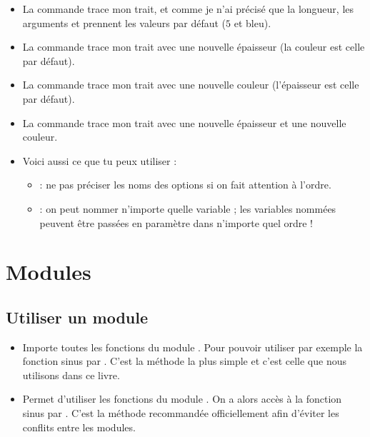 \documentclass[11pt,class=report,crop=false]{standalone}
\begin{document}
\begin{itemize}
  \item La commande  trace mon trait, et comme je n'ai précisé que la longueur, les arguments  et  prennent les valeurs par défaut ($5$ et bleu).
  
   \item La commande  trace mon trait avec une nouvelle épaisseur (la couleur est celle par défaut).
   
    \item La commande  trace mon trait avec une nouvelle couleur (l'épaisseur est celle par défaut).  
    
     \item La commande  trace mon trait avec une nouvelle épaisseur et une nouvelle couleur.
     
     \item Voici aussi ce que tu peux utiliser :
     \begin{itemize}
       \item {} : ne pas préciser les noms des options si on fait attention à l'ordre.
       \item {} : on peut nommer n'importe quelle variable ; les variables nommées peuvent être passées en paramètre dans n'importe quel ordre !
 
  \end{itemize}   
\end{itemize}   


\section{Modules}

\subsection{Utiliser un module}

\begin{itemize}
  \item {} \quad Importe toutes les fonctions du module . Pour pouvoir utiliser par exemple la fonction sinus par . C'est la méthode la plus simple et c'est celle que nous utilisons dans ce livre.
  
  \item {} \quad Permet d'utiliser les fonctions du module . On a alors accès à la fonction sinus par . C'est la méthode recommandée officiellement afin d'éviter les conflits entre les modules.
\end{itemize}
\end{document}
